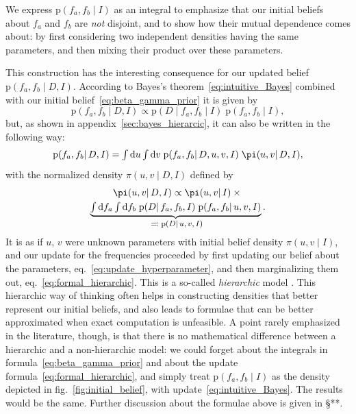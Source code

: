 \documentclass[\ifafour a4paper,12pt,\else a5paper,10pt,\fi%
onecolumn,oneside,article,%
british%
]{memoir}
\theoremstyle{remark}
\theoremstyle{innote}
\newcommand*{\citep}{\parencites}
\newcommand*{\di}{\mathrm{d}}%
\newcommand*{\defs}{\eqqcolon}
\newcommand*{\pf}{\mathrm{p}}%
\renewcommand*{\|}{\mathpunct{|}}
\newcommand*{\sect}{\S}%
\newcommand*{\eqn}{eq.}%
\newcommand*{\fig}{fig.}%
\newcommand*{\zerob}[1]{\makebox[0pt][c]{#1}}
\newcommand*{\tint}{\begingroup\textstyle\int\endgroup\nolimits}
\newcommand*{\yD}{D}
\newcommand*{\yI}{I}
\newcommand*{\ya}{a}
\newcommand*{\yb}{b}
\newcommand*{\dbeta}{\betaup}
\newcommand*{\dA}{\pi}
\newcommand*{\yua}{u}
\newcommand*{\yub}{v}
\begin{document}
We express $\pf(f_{\ya}, f_{\yb} \| \yI)$ as an integral to
emphasize that our initial beliefs about $f_{\ya}$ and
$f_{\yb}$ are \emph{not} disjoint, and to show how their mutual
dependence comes about: by first considering two independent densities
having the same parameters, and then mixing their product over these
parameters.

This construction has the interesting consequence for our updated belief
$\pf(f_{\ya}, f_{\yb} \| \yD, \yI)$. According to Bayes's
theorem~\eqref{eq:intuitive_Bayes} combined with our initial
belief~\eqref{eq:beta_gamma_prior} it is given by
\begin{equation}
  \label{eq:straight_Bayes}
  \pf(f_{\ya}, f_{\yb} \| \yD, \yI)
  \propto
  \pf(\yD \| f_{\ya}, f_{\yb} \| \yI)\;
  \pf(f_{\ya}, f_{\yb} \| \yI),
\end{equation}
but, as shown in appendix~\ref{sec:bayes_hierarcic}, it can also be written
in the following way:
\begin{equation}
  \label{eq:formal_hierarchic}
  \pf(f_{\ya}, f_{\yb} \| \yD, \yI) =
  \tint\di\yua\tint\di\yub\;
  \pf(f_{\ya}, f_{\yb}\| \yD,\yua,\yub,\yI)\;
  \dA(\yua,\yub \|\yD, \yI),
\end{equation}
with the normalized density $\dA(\yua,\yub \|\yD, \yI)$ defined by
\begin{multline}
  \label{eq:update_hyperparameter}
  \dA(\yua,\yub \|\yD, \yI) \propto   \dA(\yua,\yub \|\yI)
\times{}\\
\underbrace{\tint\di f_{\ya}\tint\di f_{\yb}\;
  \pf(\yD \|f_{\ya}, f_{\yb}, \yI)\;
 \pf(f_{\ya}, f_{\yb} \|\yua,\yub, \yI)}_{\zerob{\footnotesize${}\defs\pf(\yD \|\yua,\yub,\yI)$}}.
\end{multline}
It is as if $\yua$, $\yub$ were unknown parameters with initial belief
density $\dA(\yua,\yub \|\yI)$, and our update for the frequencies proceeded by
first updating our belief about the parameters,
\eqn~\eqref{eq:update_hyperparameter}, and then marginalizing them out,
\eqn~\eqref{eq:formal_hierarchic}. This is a so-called \emph{hierarchic}
model \citep{good1980}. This hierarchic way of thinking often helps in
constructing densities that better represent our initial beliefs, and also
leads to formulae that can be better approximated when exact computation is
unfeasible. A point rarely emphasized in the literature, though, is that
there is no mathematical difference between a hierarchic and a
non-hierarchic model: we could forget about the integrals in
formula~\eqref{eq:beta_gamma_prior} and about the update
formula~\eqref{eq:formal_hierarchic}, and simply treat
$\pf(f_{\ya}, f_{\yb} \| \yI)$ as the density depicted in
\fig~\ref{fig:initial_belief}, with update~\eqref{eq:intuitive_Bayes}. The
results would be the same. Further discussion about the formulae above is
given in \sect***.
\end{document}
